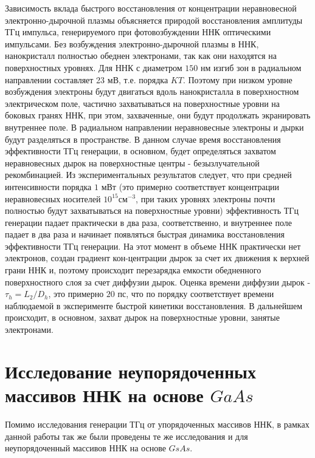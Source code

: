 \documentclass[a4paper,14pt,russian]{extreport}
\begin{document}
					Зависимость вклада быстрого восстановления от концентрации неравновесной электронно-дырочной плазмы объясняется природой восстановления амплитуды ТГц импульса, генерируемого при фотовозбуждении ННК оптическими импульсами. Без возбуждения электронно-дырочной плазмы в ННК, нанокристалл полностью обеднен электронами, так как они находятся на поверхностных уровнях. Для ННК с диаметром $150$ нм изгиб зон в радиальном направлении составляет 23 мВ, т.е. порядка $KT$. Поэтому при низком уровне возбуждения электроны будут двигаться вдоль нанокристалла в поверхностном электрическом поле, частично захватываться на поверхностные уровни на боковых гранях ННК, при этом, захваченные, они будут продолжать экранировать внутреннее поле. В радиальном направлении неравновесные электроны и дырки будут разделяться в пространстве. В данном случае время восстановления эффективности ТГц генерации, в основном, будет определяться захватом неравновесных дырок на поверхностные центры - безызлучательной рекомбинацией.  Из экспериментальных результатов следует, что при средней интенсивности порядка $1 \text{ мВт}$ (это примерно соответствует концентрации неравновесных носителей $10^{15} \text{см}^{-3}$, при таких уровнях электроны почти полностью будут захватываться на поверхностные уровни) эффективность ТГц генерации падает практически в два раза, соответственно, и внутреннее поле падает в два раза и начинает появляться быстрая динамика восстановления эффективности ТГц генерации. На этот момент в объеме ННК практически нет электронов, создан градиент кон-центрации дырок за счет их движения к верхней грани ННК и, поэтому происходит перезарядка емкости обедненного поверхностного слоя за счет диффузии дырок. Оценка времени диффузии дырок - $\tau_h = L_2/D_h$, это примерно $20$ пс, что по порядку соответствует времени наблюдаемой в эксперименте быстрой кинетики восстановления. В дальнейшем происходит, в основном, захват дырок на поверхностные уровни, занятые электронами.
		\section{Исследование неупорядоченных массивов ННК на основе $GaAs$}
			Помимо исследования генерации ТГц от упорядоченных массивов ННК, в рамках данной работы так же были проведены те же исследования и для неупорядоченный массивов ННК на основе $GsAs$.
\end{document}
